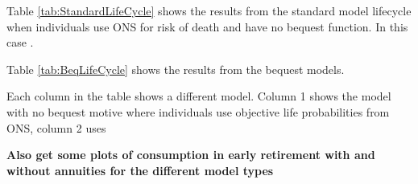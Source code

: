 \documentclass[12pt]{article}
\begin{document}
\begin{landscape}
    
\end{landscape}

Table \ref{tab:StandardLifeCycle} shows the results from the standard model lifecycle when individuals use ONS
for risk of death and have no bequest function. In this case .



\begin{landscape}
    
\end{landscape}

Table \ref{tab:BeqLifeCycle} shows the results from the bequest models.




Each column in the table shows a different model. Column 1 shows the model with no bequest motive where
individuals use objective life probabilities from ONS, column 2 uses


\textbf{Also get some plots of consumption in early retirement
    with and without annuities for the different model types}





\end{document}

